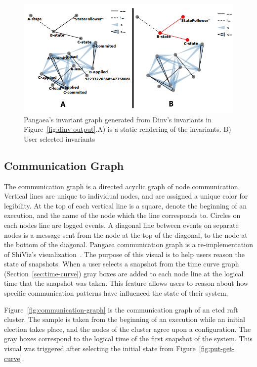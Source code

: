 \begin{figure}[h]
    \includegraphics[width=\linewidth]{fig/invariant-graph}%
    \caption{Pangaea's invariant graph generated from Dinv's invariants in Figure~\ref{fig:dinv-output}.A) is a static rendering of the invariants. B) User selected invariants \label{fig:invariant-graph}}%
\end{figure}

\subsection{Communication Graph}
\label{sec:communication-graph}

The communication graph is a directed acyclic graph of node
communication. Vertical lines are unique to individual nodes, and are
assigned a unique color for legibility. At the top of each vertical
line is a square, denote the beginning of an execution, and the name
of the node which the line corresponds to. Circles on each nodes line
are logged events. A diagonal line between events on separate nodes is
a message sent from the node at the top of the diagonal, to the node
at the bottom of the diagonal. Pangaea communication graph is a
re-implementation of ShiViz's visualization~\cite{BeschastnikhWBE2016}.
The purpose of this visual is to help users reason the state of
snapshots. When a user selects a snapshot from the time curve graph
(Section~\ref{sec:time-curve}) gray boxes are added to each node line
at the logical time that the snapshot was taken. This feature allows
users to reason about how specific communication patterns have
influenced the state of their system.

Figure~\ref{fig:communication-graph} is the communication graph of an
etcd raft cluster. The sample is taken from the beginning of an
execution while an initial election takes place, and the nodes of the
cluster agree upon a configuration. The gray boxes correspond to the
logical time of the first snapshot of the system. This visual was
triggered after selecting the initial state from
Figure~\ref{fig:put-get-curve}.


